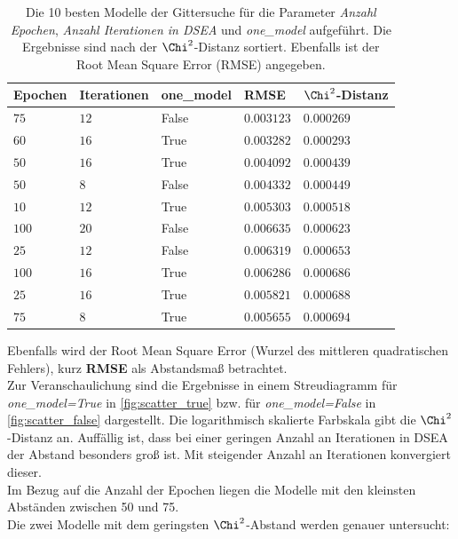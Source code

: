 \begin{table}
    \centering
    \caption{Die 10 besten Modelle der Gittersuche für die Parameter \textit{Anzahl Epochen}, \textit{Anzahl Iterationen in DSEA} und \textit{one\_model} aufgeführt. Die Ergebnisse sind nach der $\Chi^2$-Distanz sortiert. Ebenfalls ist der Root Mean Square Error (RMSE) angegeben.}
    \label{tab:gridsearch}
    \begin{tabular}{l l l | l l}
        \toprule
        Epochen & Iterationen &	one\_model & RMSE & $\Chi^2$-Distanz \\
        \midrule
        \rowcolor{tugreen}
        $75	$ & $12$ & False & $0.003123$ & $0.000269$ \\
        \rowcolor{tugreen}
        $60	$ & $16$ & True & $0.003282$ & $0.000293$ \\
        $50	$ & $16$ & True & $0.004092$ & $0.000439$ \\
        $50	$ & $8$ & False & $0.004332$ & $0.000449$ \\
        $10	$ & $12$ & True & $0.005303$ & $0.000518$ \\
        $100$ & $20$ & False & $0.006635$ & $0.000623$ \\
        $25	$ & $12$ & False & $0.006319$ & $0.000653$ \\
        $100$ & $16$ & True & $0.006286$ & $0.000686$ \\
        $25	$ & $16$ & True & $0.005821$ & $0.000688$ \\
        $75	$ & $8$ & True & $0.005655$ & $0.000694$ \\
        \bottomrule
    \end{tabular}
\end{table}
Ebenfalls wird der Root Mean Square Error (\glqq Wurzel des mittleren quadratischen Fehlers\grqq), kurz \textbf{RMSE} als Abstandsmaß betrachtet.
\\
Zur Veranschaulichung sind die Ergebnisse in einem Streudiagramm für \textit{one\_model=True} in \autoref{fig:scatter_true} bzw. für \textit{one\_model=False} in \autoref{fig:scatter_false} dargestellt.
Die logarithmisch skalierte Farbskala gibt die $\Chi^2$-Distanz an.
Auffällig ist, dass bei einer geringen Anzahl an Iterationen in DSEA der Abstand besonders groß ist.
Mit steigender Anzahl an Iterationen konvergiert dieser.
\\
Im Bezug auf die Anzahl der Epochen liegen die Modelle mit den kleinsten Abständen zwischen 50 und \SI{75}{}.
\\
Die zwei Modelle mit dem geringsten $\Chi^2$-Abstand werden genauer untersucht:

